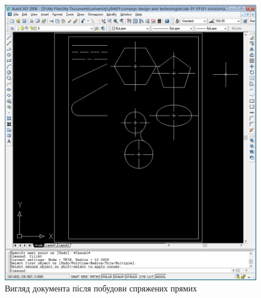 \documentclass[
	a4paper,
	oneside,
	BCOR = 10mm,
	DIV = 12,
	12pt,
	headings = normal,
]{scrartcl}
\begin{document}
			\begin{figure}[!htbp]
				\centering
				\includegraphics[height=20\baselineskip]{./assets/y04s01-csdt-lab-01-01-p09.png}
				\caption{Вигляд документа після побудови спряжених прямих}
				\label{fig:07-fillet-lines}
			\end{figure}
\end{document}
